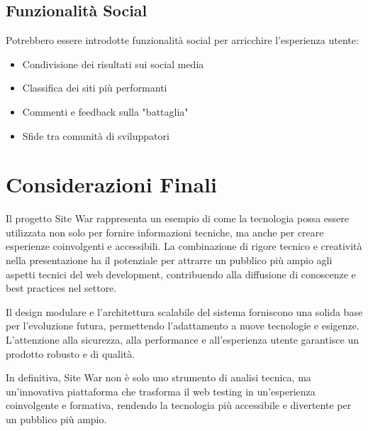 \subsection{Funzionalità Social}
Potrebbero essere introdotte funzionalità social per arricchire l'esperienza utente:

\begin{itemize}
    \item Condivisione dei risultati sui social media
    \item Classifica dei siti più performanti
    \item Commenti e feedback sulla "battaglia"
    \item Sfide tra comunità di sviluppatori
\end{itemize}

\section{Considerazioni Finali}
Il progetto Site War rappresenta un esempio di come la tecnologia possa essere utilizzata non solo per fornire informazioni tecniche, ma anche per creare esperienze coinvolgenti e accessibili. La combinazione di rigore tecnico e creatività nella presentazione ha il potenziale per attrarre un pubblico più ampio agli aspetti tecnici del web development, contribuendo alla diffusione di conoscenze e best practices nel settore.

Il design modulare e l'architettura scalabile del sistema forniscono una solida base per l'evoluzione futura, permettendo l'adattamento a nuove tecnologie e esigenze. L'attenzione alla sicurezza, alla performance e all'esperienza utente garantisce un prodotto robusto e di qualità.

In definitiva, Site War non è solo uno strumento di analisi tecnica, ma un'innovativa piattaforma che trasforma il web testing in un'esperienza coinvolgente e formativa, rendendo la tecnologia più accessibile e divertente per un pubblico più ampio.